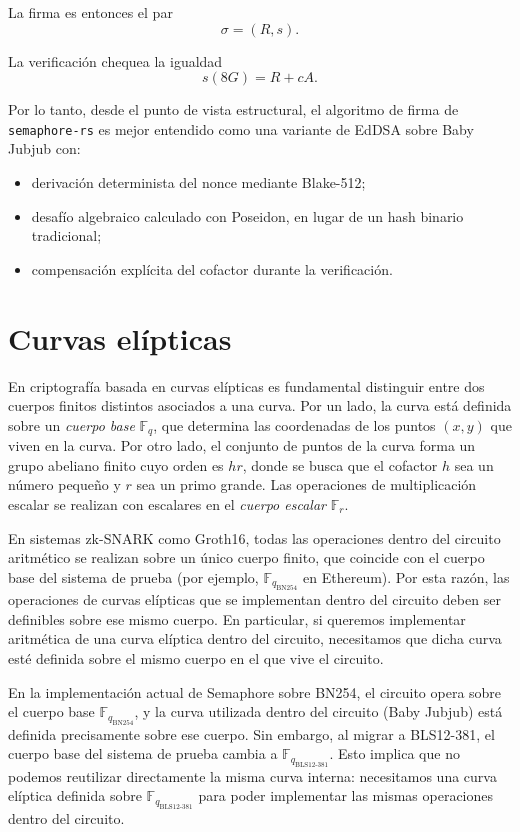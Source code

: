 \documentclass[11pt,a4paper]{article}
\begin{document}
	La firma es entonces el par
	\[
	\sigma = (R,s).
	\]
	
	La verificación chequea la igualdad
	\[
	s(8G) = R + cA.
	\]
	
	Por lo tanto, desde el punto de vista estructural, el algoritmo de firma de \texttt{semaphore-rs} es mejor entendido como una variante de EdDSA sobre Baby Jubjub con:
	\begin{itemize}
		\item derivación determinista del nonce mediante Blake-512;
		\item desafío algebraico calculado con Poseidon, en lugar de un hash binario tradicional;
		\item compensación explícita del cofactor durante la verificación.
	\end{itemize}
	
	\section{Curvas elípticas}
	
	En criptografía basada en curvas elípticas es fundamental distinguir entre dos cuerpos finitos distintos asociados a una curva. Por un lado, la curva está definida sobre un \emph{cuerpo base} $\mathbb{F}_q$, que determina las coordenadas de los puntos $(x,y)$ que viven en la curva. Por otro lado, el conjunto de puntos de la curva forma un grupo abeliano finito cuyo orden es $hr$, donde se busca que el cofactor $h$ sea un número pequeño y $r$ sea un primo grande. Las operaciones de multiplicación escalar se realizan con escalares en el \emph{cuerpo escalar} $\mathbb{F}_r$.
	
	En sistemas zk-SNARK como Groth16, todas las operaciones dentro del circuito aritmético se realizan sobre un único cuerpo finito, que coincide con el cuerpo base del sistema de prueba (por ejemplo, $\mathbb{F}_{q_{\text{BN254}}}$ en Ethereum). Por esta razón, las operaciones de curvas elípticas que se implementan dentro del circuito deben ser definibles sobre ese mismo cuerpo. En particular, si queremos implementar aritmética de una curva elíptica dentro del circuito, necesitamos que dicha curva esté definida sobre el mismo cuerpo en el que vive el circuito.
	
	En la implementación actual de Semaphore sobre BN254, el circuito opera sobre el cuerpo base $\mathbb{F}_{q_{\text{BN254}}}$, y la curva utilizada dentro del circuito (Baby Jubjub) está definida precisamente sobre ese cuerpo. Sin embargo, al migrar a BLS12-381, el cuerpo base del sistema de prueba cambia a $\mathbb{F}_{q_{\text{BLS12-381}}}$. Esto implica que no podemos reutilizar directamente la misma curva interna: necesitamos una curva elíptica definida sobre $\mathbb{F}_{q_{\text{BLS12-381}}}$ para poder implementar las mismas operaciones dentro del circuito.
	
\end{document}
